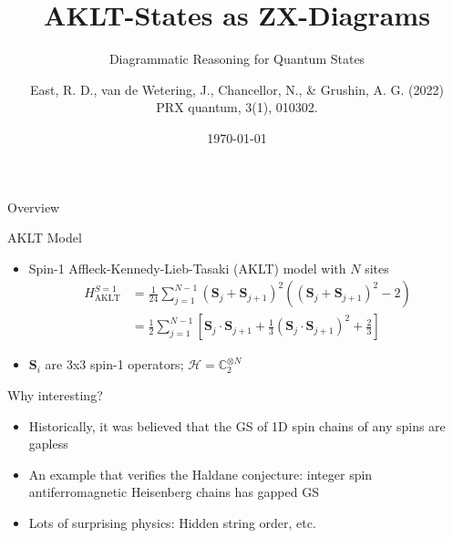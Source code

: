 \documentclass[aspectratio=169,xcolor=dvipsnames, t]{beamer}
\title[short title]{AKLT-States as ZX-Diagrams} %
\subtitle{Diagrammatic Reasoning for Quantum States}
\author[Surname]{East, R. D., van de Wetering, J., Chancellor, N., \& Grushin, A. G. (2022)\\ PRX quantum, 3(1), 010302.}
\institute[]{Presented by Yan Mong Chan}
\date{\today} %
\begin{document}
\maketitlepage

\begin{frame}[t]{Overview}
    \tableofcontents
\end{frame}

\begin{frame}{AKLT Model}
    \begin{itemize}
        \item Spin-1 Affleck-Kennedy-Lieb-Tasaki (AKLT) model with $N$ sites
        \begin{align}
            H^{S=1}_\text{AKLT} &=\frac{1}{24}\sum_{j=1}^{N-1}(\mathbf S_j + \mathbf S_{j+1})^2 \left((\mathbf S_j + \mathbf S_{j+1})^2-2\right)\\ &=\frac{1}{2} \sum_{j=1}^{N-1} \left[\mathbf S_j \cdot \mathbf S_{j+1} + \frac{1}{3} (\mathbf S_{j} \cdot \mathbf S_{j+1})^2 +\frac{2}{3}\right] \nonumber
        \end{align}
        \item $\mathbf S_{i}$ are 3x3 spin-1 operators; $\mathcal H =\mathbb C_2^{\otimes N}$ 
    \end{itemize}
\end{frame}

\begin{frame}{Why interesting?}
    \begin{itemize}
        \item Historically, it was believed that the GS of 1D spin chains of any spins are gapless
        \item An example that verifies the Haldane conjecture: integer spin antiferromagnetic Heisenberg chains has gapped GS 
        \item Lots of surprising physics: Hidden string order, etc. 
    \end{itemize}
\end{frame}

%        
\end{document}

